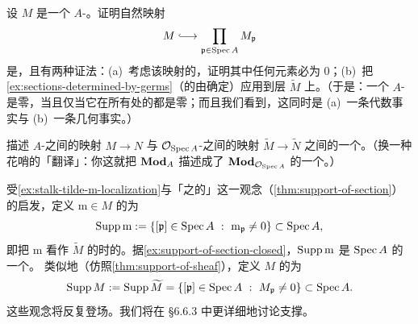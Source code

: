 \begin{exercise}\label{ex:module-to-product-localizations}
设 $M$ 是一个 $A$-\trModule。证明自然映射
\[
M\lhook\joinrel\longrightarrow\prod_{\mathfrak{p}\in\Spec A}M_{\mathfrak{p}}
\]
是\trInjectiveMap，且有两种证法：(a)~考虑该映射的\trKernel，证明其中任何元素必为 $0$；(b)~把\cref{ex:sections-determined-by-germs}（\trSheaf{}的\trSection{}由\trGerm{}确定）应用到层 $\widetilde{M}$ 上。（于是：一个 $A$-\trModule{}是零，当且仅当它在所有\trPrimeIdeal{}处的\trLocalization{}都是零；而且我们看到，这同时是 (a)~一条代数事实与 (b)~一条几何事实。）
\end{exercise}

\begin{exercise}\label{ex:module-maps-sheaf-maps}
描述 $A$-\trModule{}之间的映射 $M\to N$ 与 $\mathcal{O}_{\operatorname{Spec} A}$-\trModule{}之间的映射 $\widetilde{M}\to\widetilde{N}$ 之间的一个\trBijection。（换一种花哨的「翻译」：你这就把 $\mathbf{Mod}_{A}$ 描述成了 $\mathbf{Mod}_{\mathcal{O}_{\operatorname{Spec} A}}$ 的一个\trFullSubcategory。）
\end{exercise}

\begin{definition}[模的支撑]\label{thm:support-of-module}
受\cref{ex:stalk-tilde-m-localization}与「\trSheaf{}之\trSection{}的\trSupport{}」这一观念（\cref{thm:support-of-section}）的启发，定义 $\mathrm{m}\in M$ 的\textbf{\trSupport}为
\[
\Supp\mathrm{m}:=\{[\mathfrak{p}]\in\Spec A\ :\ \mathrm{m}_{\mathfrak{p}}\neq 0\}\subset\Spec A,
\]
即把 $\mathrm{m}$ 看作 $\widetilde{M}$ 的\trSection{}时的\trSupport。据\cref{ex:support-of-section-closed}，$\operatorname{Supp}\mathrm{m}$ 是 $\operatorname{Spec} A$ 的一个\trClosedSubset。
类似地（仿照\cref{thm:support-of-sheaf}），定义 $M$ 的\textbf{\trSupport}为
\[
\Supp M:=\Supp\widetilde{M}=\{[\mathfrak{p}]\in\Spec A\ :\ M_{\mathfrak{p}}\neq 0\}\subset\Spec A.
\]
这些观念将反复登场。我们将在 \S6.6.3 中更详细地讨论支撑。
\end{definition}

